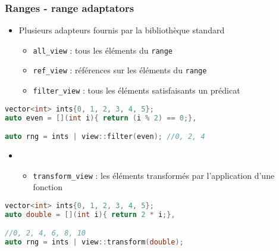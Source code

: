 \documentclass[C++.tex]{subfiles}
\begin{document}
\begin{frame}[fragile]
	\frametitle{Ranges - range adaptators}
	\begin{itemize}
		\item Plusieurs adapteurs fournis par la bibliothèque standard


		\begin{itemize}
			\item \lstinline|all_view| : tous les éléments du \lstinline|range|
			\item \lstinline|ref_view| : références sur les éléments du \lstinline|range|
			\item \lstinline|filter_view| : tous les éléments satisfaisants un prédicat
		\end{itemize}
	\end{itemize}

	\begin{lstlisting}[language=C++]
vector<int> ints{0, 1, 2, 3, 4, 5};
auto even = [](int i){ return (i % 2) == 0;},

auto rng = ints | view::filter(even); //0, 2, 4\end{lstlisting}
 
	\begin{itemize}
		\item [] \begin{itemize}
			\item \lstinline|transform_view| : les éléments transformés par l'application d'une fonction 
		\end{itemize}
	\end{itemize}

	\begin{lstlisting}[language=C++]
vector<int> ints{0, 1, 2, 3, 4, 5};
auto double = [](int i){ return 2 * i;},

//0, 2, 4, 6, 8, 10
auto rng = ints | view::transform(double);\end{lstlisting}
\end{frame}
\end{document}
